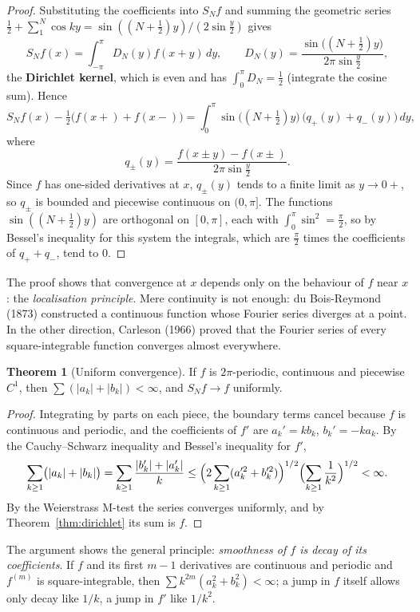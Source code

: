 \documentclass[11pt,a4paper]{article}
\numberwithin{equation}{section}
\theoremstyle{definition}
\newtheorem{thm}{Theorem}[subsection]
\begin{document}
\begin{proof}
Substituting the coefficients into $S_Nf$ and summing the geometric series $\frac12 + \sum_1^N\cos ky = \sin((N + \frac12)y)/(2\sin\frac y2)$ gives
\[
S_Nf(x) = \int_{-\pi}^\pi D_N(y)f(x + y)\,dy, \qquad D_N(y) = \frac{\sin\bigl((N + \frac12)y\bigr)}{2\pi\sin\frac y2} ,
\]
the \textbf{Dirichlet kernel}, which is even and has $\int_0^\pi D_N = \frac12$ (integrate the cosine sum). Hence
\[
S_Nf(x) - \tfrac12\bigl(f(x+) + f(x-)\bigr) = \int_0^\pi\sin\bigl((N + \tfrac12)y\bigr)\,\bigl(q_+(y) + q_-(y)\bigr)\,dy ,
\]
where
\[
q_\pm(y) = \frac{f(x \pm y) - f(x\pm)}{2\pi\sin\frac y2} .
\]
Since $f$ has one-sided derivatives at $x$, $q_\pm(y)$ tends to a finite limit as $y \to 0+$, so $q_\pm$ is bounded and piecewise continuous on $(0, \pi]$. The functions $\sin((N + \frac12)y)$ are orthogonal on $[0, \pi]$, each with $\int_0^\pi\sin^2 = \frac\pi2$, so by Bessel's inequality for this system the integrals, which are $\frac\pi2$ times the
coefficients of $q_+ + q_-$, tend to $0$.
\end{proof}

The proof shows that convergence at $x$ depends only on the behaviour of $f$ near $x$: the \emph{localisation principle}. Mere continuity is not enough: du Bois-Reymond (1873) constructed a continuous function whose Fourier series diverges at a point. In the other direction, Carleson (1966) proved
that the Fourier series of every square-integrable function converges almost everywhere.

\begin{thm}[Uniform convergence]
\label{thm:uniformfs}
If $f$ is $2\pi$-periodic, continuous and piecewise $C^1$, then $\sum(|a_k| + |b_k|) < \infty$, and $S_Nf \to f$ uniformly.
\end{thm}

\begin{proof}
Integrating by parts on each piece, the boundary terms cancel because $f$ is continuous and periodic, and the coefficients of $f'$ are $a_k' = kb_k$, $b_k' = -ka_k$. By the Cauchy--Schwarz inequality and Bessel's inequality for $f'$,
\[
\sum_{k \geq 1}\bigl(|a_k| + |b_k|\bigr) = \sum_{k \geq 1}\frac{|b_k'| + |a_k'|}k \leq \Bigl(2\sum_{k \geq 1}(a_k'^2 + b_k'^2)\Bigr)^{1/2}\Bigl(\sum_{k \geq 1}\frac1{k^2}\Bigr)^{1/2} < \infty .
\]
By the Weierstrass M-test the series converges uniformly, and by Theorem~\ref{thm:dirichlet} its sum is $f$.
\end{proof}

The argument shows the general principle: \emph{smoothness of $f$ is decay of its coefficients}. If $f$ and its first $m - 1$ derivatives are continuous and periodic and $f^{(m)}$ is square-integrable, then $\sum k^{2m}(a_k^2 + b_k^2) < \infty$; a jump in $f$ itself allows only decay like $1/k$, a jump in $f'$ like $1/k^2$.
\end{document}

